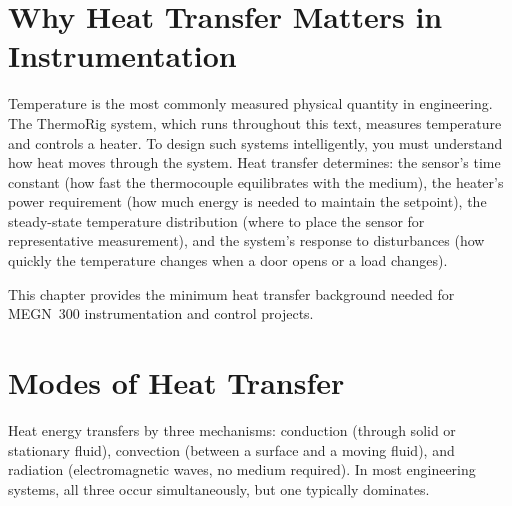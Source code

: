 \documentclass[11pt,letterpaper,twoside,openany]{book}
\begin{document}
\section{Why Heat Transfer Matters in Instrumentation}
Temperature is the most commonly measured physical quantity in engineering. The ThermoRig system, which runs throughout this text, measures temperature and controls a heater. To design such systems intelligently, you must understand how heat moves through the system. Heat transfer determines: the sensor's time constant (how fast the thermocouple equilibrates with the medium), the heater's power requirement (how much energy is needed to maintain the setpoint), the steady-state temperature distribution (where to place the sensor for representative measurement), and the system's response to disturbances (how quickly the temperature changes when a door opens or a load changes).

This chapter provides the minimum heat transfer background needed for MEGN~300 instrumentation and control projects.

\section{Modes of Heat Transfer}
Heat energy transfers by three mechanisms: conduction (through solid or stationary fluid), convection (between a surface and a moving fluid), and radiation (electromagnetic waves, no medium required). In most engineering systems, all three occur simultaneously, but one typically dominates.
\end{document}
